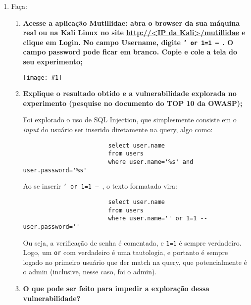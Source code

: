 \documentclass{article}
\newcommand{\code}[1]{\texttt{#1}}
\newcommand{\img}[1]{%
    \texttt{[image: \#1]}
}
\begin{document}
\begin{enumerate}
        \item Faça:
            \begin{enumerate}
                \item \textbf{Acesse a aplicação Mutillidae: abra o browser da
                        sua máquina real ou na Kali Linux no site
                        \url{http://<IP da Kali>/mutillidae} e clique em Login.
                        No campo Username, digite \texttt{' or 1=1 -- }. O
                        campo password pode ficar em branco. Copie e cole a
                    tela do seu experimento;}

                    \img{imgs/q2_2}

                \item \textbf{Explique o resultado obtido e a vulnerabilidade
                    explorada no experimento (pesquise no documento do TOP 10
                da OWASP);}

                    Foi explorado o uso de SQL Injection, que simplesmente
                    consiste em o \textit{input} do usuário ser inserido
                    diretamente na query, algo como:

                    \begin{verbatim}
                        select user.name
                        from users
                        where user.name='%s' and user.password='%s'
                    \end{verbatim}

                    Ao se inserir \code{' or 1=1 -- }, o texto formatado vira:

                    \begin{verbatim}
                        select user.name
                        from users
                        where user.name='' or 1=1 -- user.password=''
                    \end{verbatim}

                    Ou seja, a verificação de senha é comentada, e \code{1=1} é
                    sempre verdadeiro. Logo, um \code{or} com verdadeiro é uma
                    tautologia, e portanto é sempre logado no primeiro usuário
                    que der match na query, que potencialmente é o admin
                    (inclusive, nesse caso, foi o admin).

                \item \textbf{O que pode ser feito para impedir a exploração
                    dessa vulnerabilidade?}


\end{enumerate}
\end{enumerate}
\end{document}
